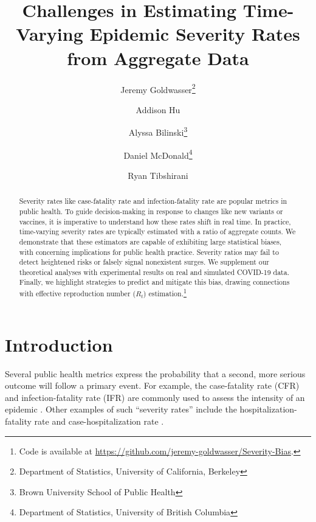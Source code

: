 \documentclass{article}
\title{Challenges in Estimating Time-Varying Epidemic Severity Rates from Aggregate Data}
\author{Jeremy Goldwasser\thanks{Department of Statistics, University of California, Berkeley} \and 
        Addison Hu\footnotemark[1] \and
        Alyssa Bilinski\thanks{Brown University School of Public Health} \and
        Daniel McDonald\thanks{Department of Statistics, University of British Columbia} \and
        Ryan Tibshirani\footnotemark[1]}
\begin{document}
\maketitle
\begin{abstract}
    Severity rates like case-fatality rate and infection-fatality rate are popular metrics in public health. To guide decision-making in response to changes like new variants or vaccines, it is imperative to understand how these rates shift in real time. 
    In practice, time-varying severity rates are typically estimated with a ratio of aggregate counts.
    We demonstrate that these estimators are capable of exhibiting large statistical biases, with concerning implications for public health practice. Severity ratios may fail to detect heightened risks or falsely signal nonexistent surges.
    We supplement our theoretical analyses with experimental results on real and simulated COVID-19 data. Finally, we highlight strategies to predict and mitigate this bias, drawing connections with effective reproduction number ($R_t$) estimation.\footnote{Code is available at \url{https://github.com/jeremy-goldwasser/Severity-Bias}.}
\end{abstract}
\section{Introduction}

Several public health metrics express the probability that a second, more serious outcome will follow a primary event. 
For example, the case-fatality rate (CFR) and infection-fatality rate (IFR) are commonly used to assess the intensity of an epidemic \citep{nishiuraEx1, nishiuraEx2, cfr_line_list, lancet_ifr, timevar_ifr}. 
Other examples of such “severity rates” include the hospitalization-fatality rate and case-hospitalization rate \citep{HFR_line_list1, HFR_linelist2, HFR_linelist3}. 
\end{document}
